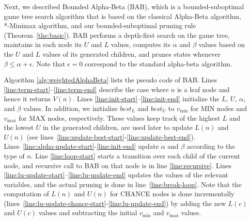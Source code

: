 \documentclass[runningheads]{llncs}
\newcommand{\MM}{\mathit{V}}
\newcommand{\pess}{\mathit{L}}
\newcommand{\opti}{\mathit{U}}
\newcommand{\besto}{\mathit{best}_{\opti}}
\newcommand{\bestp}{\mathit{best}_{\pess}}
\newcommand{\vmax}{v_{\text{max}}}
\newcommand{\vmin}{v_{\text{min}}}
\begin{document}
Next, we described Bounded Alpha-Beta (BAB), which is a bounded-suboptimal game tree search algorithm 
that is based on the classical Alpha-Beta algorithm, *-Minimax algorithm, and our bounded-suboptimal pruning rule (Theorem~\ref{the:basic}). 
BAB performs a depth-first search on the game tree, maintains in each node its $\opti$ and $\pess$ values, computes its $\alpha$ and $\beta$ values based on the $\opti$ and $\pess$ values of its generated children, and prunes states whenever $\beta \leq \alpha+\epsilon$. Note that $\epsilon=0$ correspond to the standard alpha-beta algorithm.


Algorithm \ref{alg:weightedAlphaBeta} lists the pseudo code of BAB.
Lines \ref{line:term-start}--\ref{line:term-end} describe the case where $n$ is a leaf node and hence it returns $\MM(n)$. %
Lines \ref{line:init-start}--\ref{line:init-end} initialize the $\pess$, $\opti$, $\alpha$, and $\beta$ values. In addition, we 
initialize $\bestp$ and $\besto$ to $\vmin{}$ for MIN nodes and $\vmax{}$ for MAX nodes, respectively.
These values keep track of the highest $\pess{}$ and the lowest $\opti{}$ in the generated children, are used later to update $\pess(n)$ and $\opti(n)$ (see lines~\ref{line:update-best-start}-\ref{line:update-best-end}). 
Lines~\ref{line:alpha-update-start}-\ref{line:init-end} update $\alpha$ and $\beta$ according to the type of $n$. 
Line \ref{line:loop-start} starts a transition over each child of the current node, and recursive call to BAB on that node is 
in line \ref{line:recursive}. Lines \ref{line:lu-update-start}--\ref{line:lu-update-end} updates 
the values of the relevant variables, and the actual pruning is done in line~\ref{line:break-loop}. 
Note that the computation of $\pess(n)$ and $\opti(n)$ for CHANCE nodes is done incrementally (lines~\ref{line:lu-update-chance-start}-\ref{line:lu-update-end}) by adding the new $\pess(c)$ and $\opti(c)$ values and subtracting the initial $\vmin$ and $\vmax$ values.
\end{document}
